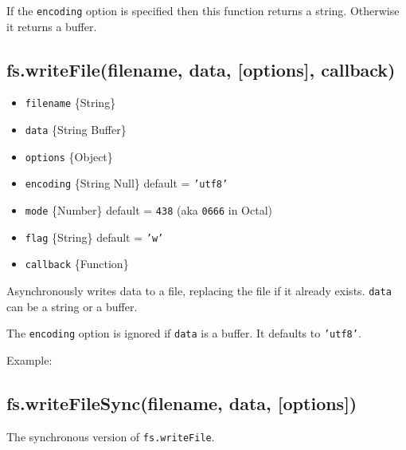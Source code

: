 If the \texttt{encoding} option is specified then this function returns
a string. Otherwise it returns a buffer.

\subsection{fs.writeFile(filename, data, {[}options{]}, callback)}

\begin{itemize}
\item
  \texttt{filename} \{String\}
\item
  \texttt{data} \{String \textbar{} Buffer\}
\item
  \texttt{options} \{Object\}
\item
  \texttt{encoding} \{String \textbar{} Null\} default = \texttt{'utf8'}
\item
  \texttt{mode} \{Number\} default = \texttt{438} (aka \texttt{0666} in
  Octal)
\item
  \texttt{flag} \{String\} default = \texttt{'w'}
\item
  \texttt{callback} \{Function\}
\end{itemize}

Asynchronously writes data to a file, replacing the file if it already
exists. \texttt{data} can be a string or a buffer.

The \texttt{encoding} option is ignored if \texttt{data} is a buffer. It
defaults to \texttt{'utf8'}.

Example:

\begin{Shaded}
\begin{Highlighting}[]
\NormalTok{(}\NormalTok{, }\NormalTok{, } 
    
  \NormalTok{(}\NormalTok{);}
\NormalTok{\});}
\end{Highlighting}
\end{Shaded}

\subsection{fs.writeFileSync(filename, data, {[}options{]})}

The synchronous version of \texttt{fs.writeFile}.

